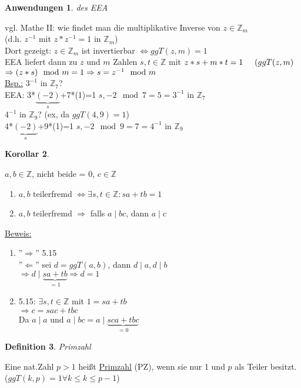 \documentclass[a4paper,11pt]{article}
\newtheorem{definition}{Definition}[section]
\newtheorem{koro}[definition]{Korollar}
\newtheorem{anw}[definition]{Anwendungen}
\newcommand{\hsp}{\hspace{5mm}}
\begin{document}
\begin{anw}
	des EEA
\end{anw}
vgl. Mathe II: wie findet man die multiplikative Inverse von $z\in\mathbb{Z}_m$ \\
(d.h. $z^{-1}$ mit $z*z^{-1}=1$ in $\mathbb{Z}_m$) \\
Dort gezeigt: $z\in\mathbb{Z}_m$ ist invertierbar $\Leftrightarrow ggT(z,m)=1$ \\
EEA liefert dann zu $z$ und $m$ Zahlen $s,t\in\mathbb{Z}$ mit $z*s+m*t=1\hsp(ggT(z,m)$ \\
$\Rightarrow (z*s)\mod m=1 \\
\Rightarrow s=z^{-1}\mod m$ \\
\underline{Bsp.:}
$3^{-1}$ in $\mathbb{Z}_7$? \\
EEA: 3*$\underbrace{(-2)}_{s}$+7*(1)=1 \hsp $s, -2\mod7=5=3^{-1}$ in $\mathbb{Z}_7$ \\
$4^{-1}$ in $\mathbb{Z}_9$? (ex, da $ggT(4,9)=1$) \\
4*$\underbrace{(-2)}_{s}$+9*(1)=1 \hsp $s, -2\mod9=7=4^{-1}$ in $\mathbb{Z}_9$ \\

\begin{koro}
\end{koro}
$a,b\in\mathbb{Z}$, nicht beide = 0, $c\in\mathbb{Z}$ 
\begin{enumerate}[label=\alph*)]
	\item $a,b$ teilerfremd $\Leftrightarrow\exists s,t\in\mathbb{Z}:sa+tb=1$
	\item $a,b$ teilerfremd $\Rightarrow$ falls $a\mid bc$, dann $a\mid c$
\end{enumerate}
\underline{Beweis:}
\begin{enumerate}[label=\alph*)]
	\item ''$\Rightarrow$'' 5.15 \\
	''$\Leftarrow$'' sei $d=ggT(a,b)$, dann $d\mid a, d\mid b$ \\
	$\Rightarrow d\mid \underbrace{sa+tb}_{=1}\Rightarrow d=1$
	\item 5.15: $\exists s,t\in\mathbb{Z}$ mit $1=sa+tb$ \\
	$\Rightarrow c=sac+tbc$ \\
	Da $a\mid a$ und $a\mid bc=a\mid\underbrace{sca+tbc}_{=0}$
\end{enumerate}

\newpage

\begin{definition}
	Primzahl
\end{definition}
Eine nat.Zahl $p>1$ heißt \underline{Primzahl} (PZ), wenn sie nur 1 und $p$ als Teiler besitzt. \\
($ggT(k,p)=1\forall k\leq k\leq p-1$)
\end{document}
